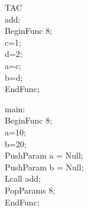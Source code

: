 \begin{latin}
TAC
\\
\underline{\hspace{.05in}}add:
\\
BeginFunc 8;
\\
c=1;
\\
d=2;
\\
a=c;
\\
b=d;
\\
EndFunc;

\underline{\hspace{.05in}}main:
\\
BeginFunc 8;
\\
a=10;
\\
b=20;
\\
PushParam a = Null;
\\
PushParam b = Null;
\\
Lcall \underline{\hspace{.05in}}add;
\\
PopParams 8;
\\
EndFunc;
\\
\end{latin}

